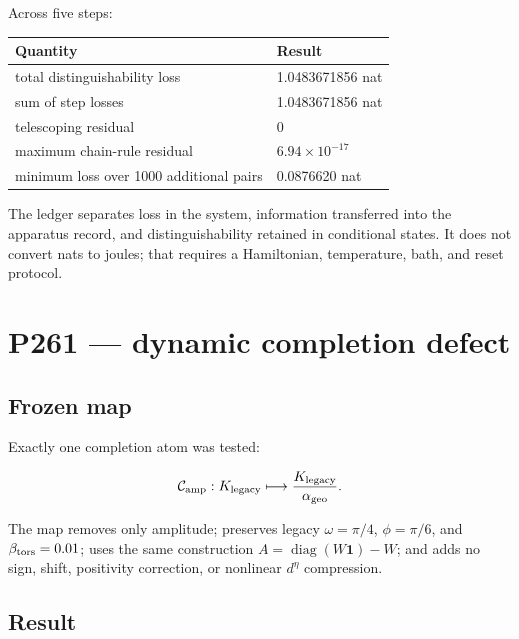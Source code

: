\documentclass[11pt,a4paper,openany]{report}
\begin{document}
Across five steps:

\begin{center}
\begingroup\small
\setlength{\tabcolsep}{2.5pt}
\renewcommand{\arraystretch}{1.16}
\begin{longtable}{@{}p{}p{}@{}}
\toprule
\textbf{Quantity} & \textbf{Result} \\
\midrule
\endhead
total distinguishability loss & 1.0483671856 nat \\
sum of step losses & 1.0483671856 nat \\
telescoping residual & 0 \\
maximum chain-rule residual & \(6.94\times10^{-17}\) \\
minimum loss over 1000 additional pairs & 0.0876620 nat \\
\bottomrule
\end{longtable}
\endgroup
\end{center}

The ledger separates loss in the system, information transferred into the apparatus record, and distinguishability retained in conditional states. It does not convert nats to joules; that requires a Hamiltonian, temperature, bath, and reset protocol.

\chapter{P261 --- dynamic completion defect}

\section{Frozen map}

Exactly one completion atom was tested:

\[
\mathcal C_{\rm amp}:
K_{\rm legacy}
\longmapsto
\frac{K_{\rm legacy}}{\alpha_{\rm geo}}.
\]

The map removes only amplitude; preserves legacy \(\omega=\pi/4\), \(\phi=\pi/6\), and \(\beta_{\rm tors}=0.01\); uses the same construction \(A=\operatorname{diag}(W\mathbf1)-W\); and adds no sign, shift, positivity correction, or nonlinear \(d^\eta\) compression.

\section{Result}
\end{document}
